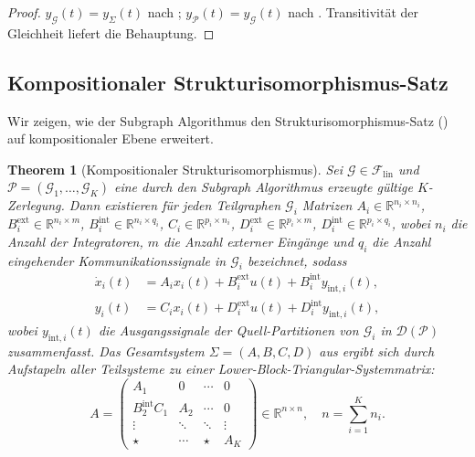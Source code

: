 ﻿\documentclass[12pt,a4paper]{article}
\newtheorem{theorem}{Theorem}[section]
\theoremstyle{definition}
\begin{document}
\begin{proof}
$y_{\mathcal{G}}(t) = y_{\Sigma}(t)$ nach ;
$y_{\mathcal{P}}(t) = y_{\mathcal{G}}(t)$ nach .
Transitivität der Gleichheit liefert die Behauptung.
\end{proof}

\subsection{Kompositionaler Strukturisomorphismus-Satz}
\label{subsec:subgraph-iso}

Wir zeigen, wie der Subgraph Algorithmus den Strukturisomorphismus-Satz
() auf kompositionaler Ebene erweitert.

\begin{theorem}[Kompositionaler Strukturisomorphismus]
\label{thm:comp-iso}
Sei $\mathcal{G} \in \mathcal{F}_{\mathrm{lin}}$ und
$\mathcal{P} = (\mathcal{G}_1, \ldots, \mathcal{G}_K)$ eine durch den
Subgraph Algorithmus erzeugte gültige $K$-Zerlegung. Dann existieren für
jeden Teilgraphen $\mathcal{G}_i$ Matrizen
$A_i \in \mathbb{R}^{n_i \times n_i}$,
$B_i^{\mathrm{ext}} \in \mathbb{R}^{n_i \times m}$,
$B_i^{\mathrm{int}} \in \mathbb{R}^{n_i \times q_i}$,
$C_i \in \mathbb{R}^{p_i \times n_i}$,
$D_i^{\mathrm{ext}} \in \mathbb{R}^{p_i \times m}$,
$D_i^{\mathrm{int}} \in \mathbb{R}^{p_i \times q_i}$,
wobei $n_i$ die Anzahl der Integratoren, $m$ die Anzahl externer Eingänge
und $q_i$ die Anzahl eingehender Kommunikationssignale in $\mathcal{G}_i$
bezeichnet, sodass
\begin{align}
  \dot{x}_i(t) &= A_i x_i(t) + B_i^{\mathrm{ext}} u(t)
                  + B_i^{\mathrm{int}} y_{\mathrm{int},i}(t), \label{eq:comp-state}\\
  y_i(t)       &= C_i x_i(t) + D_i^{\mathrm{ext}} u(t)
                  + D_i^{\mathrm{int}} y_{\mathrm{int},i}(t), \label{eq:comp-out}
\end{align}
wobei $y_{\mathrm{int},i}(t)$ die Ausgangssignale der Quell-Partitionen
von $\mathcal{G}_i$ in $\mathcal{D}(\mathcal{P})$ zusammenfasst.
Das Gesamtsystem $\Sigma = (A, B, C, D)$ aus  ergibt sich
durch Aufstapeln aller Teilsysteme zu einer Lower-Block-Triangular-Systemmatrix:
\[
  A = \begin{pmatrix}
    A_1             & 0      & \cdots & 0 \\
    B_2^{\mathrm{int}} C_1 & A_2    & \cdots & 0 \\
    \vdots          & \ddots & \ddots & \vdots \\
    \star           & \cdots & \star  & A_K
  \end{pmatrix} \in \mathbb{R}^{n \times n}, \quad n = \sum_{i=1}^K n_i.
\]
\end{theorem}
\end{document}
